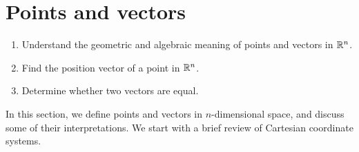 \section{Points and vectors}

\begin{outcome}
  \begin{enumerate}
  \item Understand the geometric and algebraic meaning of points and
    vectors in $\mathbb{R}^n$.
  \item Find the position vector of a point in $\mathbb{R}^n$.
  \item Determine whether two vectors are equal.
  \end{enumerate}
\end{outcome}

In this section, we define points and vectors in $n$-dimensional
space, and discuss some of their interpretations. We start with a
brief review of Cartesian coordinate systems.
\bigskip


